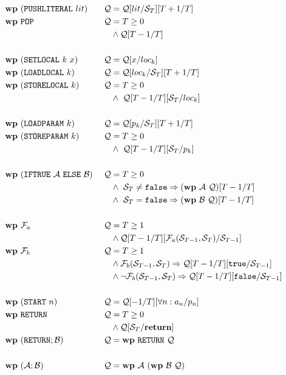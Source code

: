 \documentclass[a4paper]{article}
\begin{document}
\begin{alignat*}{3}
\mathbf{wp}\ &(\mathtt{PUSHLITERAL}\ lit)\ &\mathcal{Q} &= \mathcal{Q}[lit / \mathcal{S}_{T}][T + 1 / T]\\
\mathbf{wp}\ &\mathtt{POP}\ &\mathcal{Q} &= T \geq 0\\
&&&\wedge \mathcal{Q}[T - 1 / T]\\\\
\mathbf{wp}\ &(\mathtt{SETLOCAL}\ k\ x)\ &\mathcal{Q} &= \mathcal{Q}[x / loc_k]\\
\mathbf{wp}\ &(\mathtt{LOADLOCAL}\ k)\ &\mathcal{Q} &= \mathcal{Q}[loc_k / \mathcal{S}_{T}][T + 1 / T]\\
\mathbf{wp}\ &(\mathtt{STORELOCAL}\ k)\ &\mathcal{Q} &= T \geq 0\\
&&&\wedge\ \mathcal{Q}[T - 1 / T][\mathcal{S}_{T} / loc_k]\\\\
\mathbf{wp}\ &(\mathtt{LOADPARAM}\ k)\ &\mathcal{Q} &= \mathcal{Q}[p_k / \mathcal{S}_{T}][T + 1 / T]\\
\mathbf{wp}\ &(\mathtt{STOREPARAM}\ k)\ &\mathcal{Q} &= T \geq 0\\
&&&\wedge\ \mathcal{Q}[T - 1 / T][\mathcal{S}_{T} / p_k]\\\\
\mathbf{wp}\ &(\mathtt{IFTRUE}\ \mathcal{A}\ \mathtt{ELSE}\ \mathcal{B})\ &\mathcal{Q} &= T \geq 0\\
&&&\wedge\ \mathcal{S}_{T} \neq \mathtt{false} \Rightarrow (\mathbf{wp}\ \mathcal{A}\ \mathcal{Q})[T - 1 / T]\\
&&&\wedge\ \mathcal{S}_{T} = \mathtt{false} \Rightarrow (\mathbf{wp}\ \mathcal{B}\ \mathcal{Q})[T - 1 / T]\\\\
\mathbf{wp}\ &\mathcal{F}_a\ &\mathcal{Q} &= T \geq 1\\
&&&\wedge \mathcal{Q}[T - 1 / T][\mathcal{F}_a(\mathcal{S}_{T-1}, \mathcal{S}_{T}) / \mathcal{S}_{T-1}]\\
\mathbf{wp}\ &\mathcal{F}_b\ &\mathcal{Q} &= T \geq 1\\
&&&\wedge \mathcal{F}_b(\mathcal{S}_{T-1}, \mathcal{S}_{T}) \Rightarrow \mathcal{Q}[T - 1 / T][\mathtt{true} / \mathcal{S}_{T-1}]\\
&&&\wedge \neg \mathcal{F}_b(\mathcal{S}_{T-1}, \mathcal{S}_{T}) \Rightarrow \mathcal{Q}[T - 1 / T][\mathtt{false} / \mathcal{S}_{T-1}]\\\\
\mathbf{wp}\ &(\mathtt{START}\ n)\ &\mathcal{Q} &= \mathcal{Q}[-1 / T][\forall n : a_n / p_n]\\
\mathbf{wp}\ &\mathtt{RETURN}\ &\mathcal{Q} &= T \geq 0\\
&&&\wedge \mathcal{Q}[\mathcal{S}_{T} / \mathbf{return}]\\
\mathbf{wp}\ &(\mathtt{RETURN}; \mathcal{B})\ &\mathcal{Q} &= \mathbf{wp}\ \mathtt{RETURN}\ \mathcal{Q}\\\\
\mathbf{wp}\ &(\mathcal{A}; \mathcal{B})\ &\mathcal{Q} &= \mathbf{wp}\ \mathcal{A}\ (\mathbf{wp}\ \mathcal{B}\ \mathcal{Q})
\end{alignat*}
\end{document}
